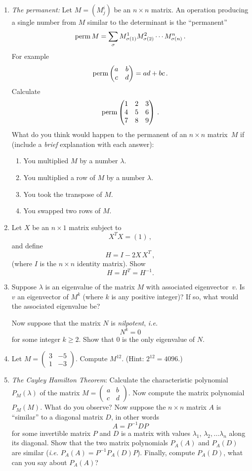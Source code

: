 \begin{enumerate}
\item
{\it The permanent:} Let $M=(M^i_j)$ be an $n\times n$ matrix. An operation producing a single number from $M$ similar
to the determinant is the ``permanent''
\[
{\rm perm} \, M =\sum_\sigma M^1_{\sigma(1)} M^2_{\sigma(2)}\cdots M^n_{\sigma(n)}\, .
\]
For example
\[
{\rm perm} \begin{pmatrix}a & b \\ c & d\end{pmatrix}=ad+bc\, .
\]
{Calculate} 
\[
{\rm perm} \begin{pmatrix}1 & 2 & 3 \\ 4 & 5 & 6 \\ 7 & 8 & 9\end{pmatrix}\, .
\]
\noindent
What do you think would happen to the permanent of an $n\times n$ matrix~$M$ if (include a {\it brief} explanation with each answer):
\begin{enumerate}
\item You multiplied $M$ by a number $\lambda$.
\item You multiplied a row of $M$ by a number $\lambda$.
\item You took the transpose of $M$.
\item  You swapped two rows of $M$.
\end{enumerate}


\item
Let $X$ be an $n\times 1$ matrix subject to
\[
{X}^{T} X=(1)\, ,
\]
and define
\[
H=I - 2 X \,\!X^T\, ,
\]
(where $I$ is the $n\times n$ identity matrix).
Show 
\[
H=H^{T}=H^{-1}.
\]

\item Suppose $\lambda$ is an eigenvalue of the matrix $M$ with associated eigenvector~$v$.
Is~$v$ an eigenvector of $M^k$ (where $k$ is any positive integer)? If so, what would the associated
eigenvalue be?

Now suppose that the matrix $N$ is {\it nilpotent}, {\it i.e.}
\[
N^k=0
\]
for some integer $k\geq 2$. Show that 0 is the only eigenvalue of $N$.

\item
Let $M=\begin{pmatrix}3&-5\\[2mm]1&-3\end{pmatrix}$. Compute $M^{12}$. (Hint: $2^{12}=4096$.)

\item {\it The Cayley Hamilton Theorem}:
Calculate the characteristic polynomial $P_M(\lambda)$ of the matrix $M=\begin{pmatrix}a & b\\c & d\end{pmatrix}$.
Now compute the matrix polynomial $P_M(M)$. What do you observe? Now suppose the $n\times n$ matrix $A$
is ``similar'' to a diagonal matrix $D$, in other words \[A=P^{-1}DP\] for some invertible matrix $P$ and $D$ is a matrix with values $\lambda_1$, $\lambda_2,\ldots \lambda_n$ along its diagonal. Show that the two matrix polynomials $P_A(A)$ and $P_A(D)$ are similar ({\it i.e.} $P_A(A)=P^{-1} P_A(D) P$).
Finally, compute $P_A(D)$, what can you say about $P_A(A)$?


\end{enumerate}
